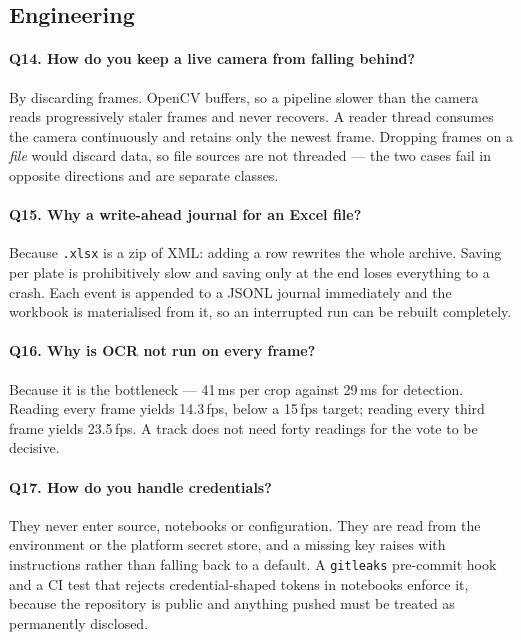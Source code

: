 \documentclass[11pt,a4paper]{article}
\begin{document}
\subsection*{Engineering}

\paragraph{Q14. How do you keep a live camera from falling behind?}
By discarding frames. OpenCV buffers, so a pipeline slower than the camera reads
progressively staler frames and never recovers. A reader thread consumes the
camera continuously and retains only the newest frame. Dropping frames on a
\emph{file} would discard data, so file sources are not threaded --- the two
cases fail in opposite directions and are separate classes.

\paragraph{Q15. Why a write-ahead journal for an Excel file?}
Because \texttt{.xlsx} is a zip of XML: adding a row rewrites the whole archive.
Saving per plate is prohibitively slow and saving only at the end loses
everything to a crash. Each event is appended to a JSONL journal immediately and
the workbook is materialised from it, so an interrupted run can be rebuilt
completely.

\paragraph{Q16. Why is OCR not run on every frame?}
Because it is the bottleneck --- 41\,ms per crop against 29\,ms for detection.
Reading every frame yields 14.3\,fps, below a 15\,fps target; reading every third
frame yields 23.5\,fps. A track does not need forty readings for the vote to be
decisive.

\paragraph{Q17. How do you handle credentials?}
They never enter source, notebooks or configuration. They are read from the
environment or the platform secret store, and a missing key raises with
instructions rather than falling back to a default. A \texttt{gitleaks}
pre-commit hook and a CI test that rejects credential-shaped tokens in notebooks
enforce it, because the repository is public and anything pushed must be treated
as permanently disclosed.
\end{document}
